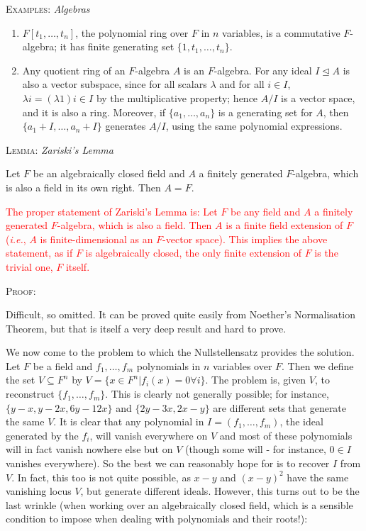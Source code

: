 \documentclass[12pt,a4paper]{article}
\newcommand{\proof}{\noindent\textsc{\large Proof:}\par}
\newcommand{\lemma}[1]{\noindent\textsc{\large Lemma:}  \textit{\large #1}\par}
\newcommand{\example}[1]{\noindent\textsc{\large Examples:}  \textit{\large #1}\par}
\newcommand{\red}[1]{\textcolor{red}{#1}}
\newcommand{\gap}{\par \vspace{5mm}}
\let\ideal\trianglelefteq
\begin{document}
\example{Algebras}
\begin{enumerate}
\item $F[t_1,\hdots,t_n]$, the polynomial ring over $F$ in $n$ variables, is a commutative $F$-algebra; it has finite generating set $\{1,t_1,\hdots,t_n\}$.
\item Any quotient ring of an $F$-algebra $A$ is an $F$-algebra. For any ideal $I\ideal A$ is also a vector subspace, since for all scalars $\lambda$ and for all $i\in I$, $\lambda i=(\lambda 1)i\in I$ by the multiplicative property; hence $A/I$ is a vector space, and it is also a ring. Moreover, if $\{a_1,\hdots,a_n\}$ is a generating set for $A$, then $\{a_1+I,\hdots,a_n+I\}$ generates $A/I$, using the same polynomial expressions.
\end{enumerate}

\lemma{Zariski's Lemma}
Let $F$ be an algebraically closed field and $A$ a finitely generated $F$-algebra, which is also a field in its own right. Then $A=F$.

\red{The proper statement of Zariski's Lemma is: Let $F$ be any field and $A$ a finitely generated $F$-algebra, which is also a field. Then $A$ is a finite field extension of $F$ (\textit{i.e.}, $A$ is finite-dimensional as an $F$-vector space). This implies the above statement, as if $F$ is algebraically closed, the only finite extension of $F$ is the trivial one, $F$ itself.}\gap

\proof
Difficult, so omitted. It can be proved quite easily from Noether's Normalisation Theorem, but that is itself a very deep result and hard to prove.\gap

We now come to the problem to which the Nullstellensatz provides the solution. Let $F$ be a field and $f_1,\hdots,f_m$ polynomials in $n$ variables over $F$. Then we define the set $V\subseteq F^n$ by $V=\{x\in F^n | f_i(x)=0 \forall i\}$. The problem is, given $V$, to reconstruct $\{f_1,\hdots,f_m\}$. This is clearly not generally possible; for instance, $\{y-x,y-2x, 6y-12x\}$ and $\{2y-3x, 2x-y\}$ are different sets that generate the same $V$. It is clear that any polynomial in $I=(f_1,\hdots,f_m)$, the ideal generated by the $f_i$, will vanish everywhere on $V$ and most of these polynomials will in fact vanish nowhere else but on $V$ (though some will - for instance, $0\in I$ vanishes everywhere). So the best we can reasonably hope for is to recover $I$ from $V$. In fact, this too is not quite possible, as $x-y$ and $(x-y)^2$ have the same vanishing locus $V$, but generate different ideals. However, this turns out to be the last wrinkle (when working over an algebraically closed field, which is a sensible condition to impose when dealing with polynomials and their roots!):\gap
\end{document}

